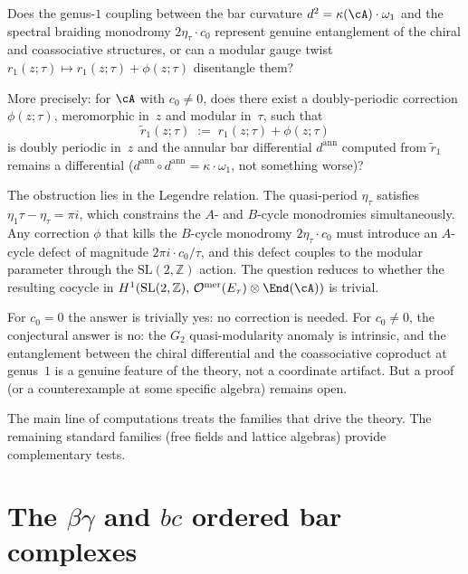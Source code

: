 \begin{question}
\label{q:genus1-entanglement}
Does the genus-$1$ coupling between the bar curvature
$d^2=\kappa(\cA)\cdot\omega_1$ and the spectral braiding
monodromy $2\eta_\tau\cdot c_0$ represent genuine entanglement
of the chiral and coassociative structures, or can a modular gauge twist
$r_1(z;\tau)\mapsto r_1(z;\tau)+\phi(z;\tau)$ disentangle them?

More precisely: for $\cA$ with $c_0\ne 0$, does there exist
a doubly-periodic correction $\phi(z;\tau)$, meromorphic in~$z$
and modular in~$\tau$, such that
\[
\widetilde{r}_1(z;\tau)
\;:=\;
r_1(z;\tau)+\phi(z;\tau)
\]
is doubly periodic in~$z$ and the annular bar differential
$d^{\mathrm{ann}}$ computed from $\widetilde{r}_1$ remains
a differential \textup{(}$d^{\mathrm{ann}}\circ d^{\mathrm{ann}}
=\kappa\cdot\omega_1$, not something worse\textup{)}?

The obstruction lies in the Legendre relation. The
quasi-period $\eta_\tau$ satisfies
$\eta_1\tau-\eta_\tau=\pi i$, which constrains the
$A$- and $B$-cycle monodromies simultaneously. Any
correction $\phi$ that kills the $B$-cycle monodromy
$2\eta_\tau\cdot c_0$ must introduce an $A$-cycle defect of
magnitude $2\pi i\cdot c_0/\tau$, and this defect couples
to the modular parameter through the $\mathrm{SL}(2,\mathbb{Z})$
action. The question reduces to whether the resulting
cocycle in
$H^1(\mathrm{SL}(2,\mathbb{Z}),\,
\mathcal{O}^{\mathrm{mer}}(E_\tau)\otimes\End(\cA))$
is trivial.

For $c_0=0$ the answer is trivially yes: no correction
is needed. For $c_0\ne 0$, the conjectural answer is no: the
$G_2$ quasi-modularity anomaly
is intrinsic, and the entanglement between the chiral differential
and the coassociative coproduct
at genus~$1$ is a genuine feature of the theory, not a
coordinate artifact. But a proof (or a counterexample
at some specific algebra) remains open.
\end{question}

\bigskip
The main line of computations treats the families that drive the
theory. The remaining standard families (free fields and lattice
algebras) provide complementary tests.

\section{The \texorpdfstring{$\beta\gamma$}{beta-gamma} and
 \texorpdfstring{$bc$}{bc} ordered bar complexes}
\label{subsec:betagamma-ordered-bar}

